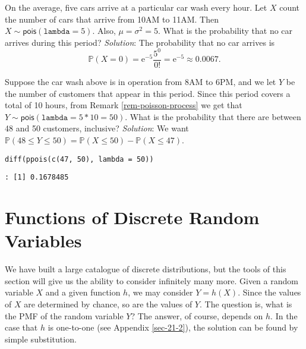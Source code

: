On the average, five cars arrive at a particular car wash every
hour. Let \(X\) count the number of cars that arrive from 10AM to
11AM. Then \(X\sim\mathsf{pois}(\mathtt{lambda}=5)\). Also,
\(\mu=\sigma^{2}=5\). What is the probability that no car arrives
during this period?  \emph{Solution}: The probability that no car arrives
is \[
\mathbb{P}(X=0)=\mathrm{e}^{-5}\frac{5^{0}}{0!}=\mathrm{e}^{-5}\approx0.0067.
\]



Suppose the car wash above is in operation from 8AM to 6PM, and we let
\(Y\) be the number of customers that appear in this period. Since
this period covers a total of 10 hours, from Remark \ref{rem-poisson-process} we
get that \(Y\sim\mathsf{pois}(\mathtt{lambda}=5\ast10=50)\). What is
the probability that there are between 48 and 50 customers, inclusive?
\emph{Solution}: We want \(\mathbb{P}(48\leq
Y\leq50)=\mathbb{P}(X\leq50)-\mathbb{P}(X\leq47)\).

\begin{verbatim}
diff(ppois(c(47, 50), lambda = 50))
\end{verbatim}

\begin{verbatim}
: [1] 0.1678485
\end{verbatim}

\section{Functions of Discrete Random Variables}
\label{sec-5-7}

We have built a large catalogue of discrete distributions, but the
tools of this section will give us the ability to consider infinitely
many more. Given a random variable \(X\) and a given function \(h\),
we may consider \(Y=h(X)\). Since the values of \(X\) are determined
by chance, so are the values of \(Y\). The question is, what is the
PMF of the random variable \(Y\)? The answer, of course, depends on
\(h\). In the case that \(h\) is one-to-one (see Appendix
\ref{sec-21-2}), the solution can be found by simple
substitution.


